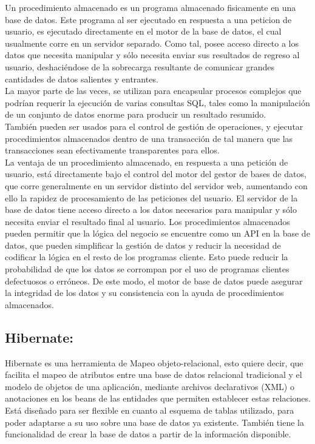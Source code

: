 \documentclass[spanish]{article}
\begin{document}
Un procedimiento almacenado es un programa almacenado fisicamente en una base de datos.
Este programa al ser ejecutado en respuesta a una peticion de usuario, es ejecutado directamente en el motor de la base de datos, el cual usualmente corre en un servidor separado. Como tal, posee acceso directo a los datos que necesita manipular y sólo necesita enviar sus resultados de regreso al usuario, deshaciéndose de la sobrecarga resultante de comunicar grandes cantidades de datos salientes y entrantes. \\

La mayor parte de las veces, se utilizan para encapsular procesos complejos que podrían requerir  la ejecución de varias consultas SQL, tales como la manipulación de un conjunto de datos enorme para producir un resultado resumido. \\

También pueden ser usados para el control de gestión de operaciones, y ejecutar procedimientos almacenados dentro de una transacción de tal manera que las transacciones sean efectivamente transparentes para ellos. \\

La ventaja de un procedimiento almacenado, en respuesta a una petición de usuario, está directamente bajo el control del motor del gestor de bases de datos, que corre generalmente en un servidor distinto del servidor web, aumentando con ello la rapidez de procesamiento de las peticiones del usuario. El servidor de la base de datos tiene acceso directo a los datos necesarios para manipular y sólo necesita enviar el resultado final al usuario. Los procedimientos almacenados pueden permitir que la lógica del negocio se encuentre como un API en la base de datos, que pueden simplificar la gestión de datos y reducir la necesidad de codificar la lógica en el resto de los programas cliente. Esto puede reducir la probabilidad de que los datos se corrompan por el uso de programas clientes defectuosos o erróneos. De este modo, el motor de base de datos puede asegurar la integridad de los datos y su consistencia con la ayuda de procedimientos almacenados.


\subsection{Hibernate:}

Hibernate es una herramienta de Mapeo objeto-relacional, esto quiere decir, que facilita el mapeo de atributos entre una base de datos relacional tradicional y el modelo de objetos de una aplicación, mediante archivos declarativos (XML) o anotaciones en los beans de las entidades que permiten establecer estas relaciones. \\
Está diseñado para ser flexible en cuanto al esquema de tablas utilizado, para poder adaptarse a su uso sobre una base de datos ya existente. También tiene la funcionalidad de crear la base de datos a partir de la información disponible. \\
\end{document}
